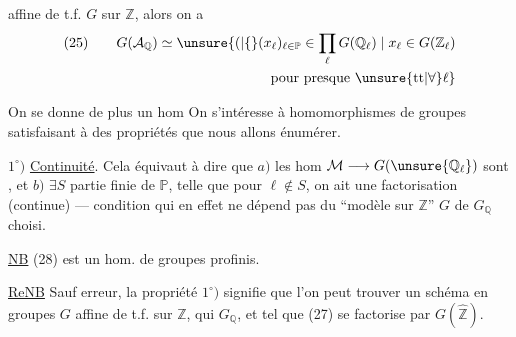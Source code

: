 
affine de t.f. \(G\) sur \(\mathbb{Z}\), alors on a
\[
\begin{gathered}
(25)\qquad G(\mathcal{A}_{\mathbb{Q}})\simeq
\unsure{(|\{}(x_{\ell})_{\ell\in\mathbb{P}}\in\prod_{\ell}G(\mathbb{Q}_{\ell})
\mid x_{\ell}\in G(\mathbb{Z}_{\ell})\\
\hfill\text{pour presque }\unsure{\mathrm{tt}|\forall}\ell\}
\end{gathered}
\]


On se donne de plus un hom
On s'intéresse à  homomorphismes de groupes
satisfaisant à des propriétés que nous allons énumérer.

\(1^\circ)\) \uline{Continuité}. Cela équivaut à dire que \(a)\) les hom \(\mathcal{M}\longrightarrow G(\unsure{\mathbb{Q}_{\ell}})\) sont , et \(b)\) \(\exists S\) partie finie de \(\mathbb{P}\), telle que pour \(\ell\notin S\), on ait  une factorisation (continue)
--- condition qui en effet ne dépend pas du ``modèle sur \(\mathbb{Z}\)'' \(G\) de \(G_{\mathbb{Q}}\) choisi.

\uline{NB} (28) est un hom. de groupes profinis.


\uline{ReNB} Sauf erreur, la propriété \(1^\circ)\) signifie que l'on peut trouver un schéma en groupes \(G\) affine de t.f. sur \(\mathbb{Z}\), qui  \(G_{\mathbb{Q}}\), et tel que (27) se factorise par \(G(\widehat{\mathbb{Z}})\).

